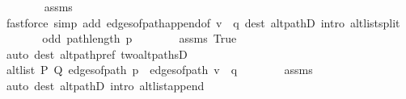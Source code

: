 \begin{isabellebody}
\ \ \ \ \ \ \isamarkupfalse%
\ assms{\isacharparenleft}{\kern0pt}{}{\isacharparenright}{\kern0pt}\isanewline
\ \ \ \ \ \ \isamarkupfalse%
\ {\isacharparenleft}{\kern0pt}fastforce\ simp\ add{\isacharcolon}{\kern0pt}\ edges{\isacharunderscore}{\kern0pt}of{\isacharunderscore}{\kern0pt}path{\isacharunderscore}{\kern0pt}append{\isacharunderscore}{\kern0pt}{}{\isacharbrackleft}{\kern0pt}of\ {\isachardoublequoteopen}v\ {\isacharhash}{\kern0pt}\ q{\isachardoublequoteclose}{\isacharbrackright}{\kern0pt}\ dest{\isacharcolon}{\kern0pt}\ alt{\isacharunderscore}{\kern0pt}pathD{\isacharparenleft}{\kern0pt}{}{\isacharparenright}{\kern0pt}\ intro{\isacharcolon}{\kern0pt}\ alt{\isacharunderscore}{\kern0pt}list{\isacharunderscore}{\kern0pt}split{\isacharunderscore}{\kern0pt}{}{\isacharparenright}{\kern0pt}\isanewline
\ \ \ \ \isamarkupfalse%
\ \isamarkupfalse%
\ {\isachardoublequoteopen}odd\ {\isacharparenleft}{\kern0pt}path{\isacharunderscore}{\kern0pt}length\ p{\isacharprime}{\kern0pt}{\isacharparenright}{\kern0pt}{\isachardoublequoteclose}\isanewline
\ \ \ \ \ \ \isamarkupfalse%
\ assms\ True\isanewline
\ \ \ \ \ \ \isamarkupfalse%
\ {\isacharparenleft}{\kern0pt}auto\ dest{\isacharcolon}{\kern0pt}\ alt{\isacharunderscore}{\kern0pt}path{\isacharunderscore}{\kern0pt}pref\ two{\isacharunderscore}{\kern0pt}alt{\isacharunderscore}{\kern0pt}pathsD{\isacharparenright}{\kern0pt}\isanewline
\ \ \ \ \isamarkupfalse%
\ \isamarkupfalse%
\ {\isachardoublequoteopen}alt{\isacharunderscore}{\kern0pt}list\ P\ Q\ {\isacharparenleft}{\kern0pt}edges{\isacharunderscore}{\kern0pt}of{\isacharunderscore}{\kern0pt}path\ p{\isacharprime}{\kern0pt}\ {\isacharat}{\kern0pt}\ edges{\isacharunderscore}{\kern0pt}of{\isacharunderscore}{\kern0pt}path\ {\isacharparenleft}{\kern0pt}v\ {\isacharhash}{\kern0pt}\ q{\isacharparenright}{\kern0pt}{\isacharparenright}{\kern0pt}{\isachardoublequoteclose}\isanewline
\ \ \ \ \ \ \isamarkupfalse%
\ assms{\isacharparenleft}{\kern0pt}{}{\isacharparenright}{\kern0pt}\isanewline
\ \ \ \ \ \ \isamarkupfalse%
\ {\isacharparenleft}{\kern0pt}auto\ dest{\isacharcolon}{\kern0pt}\ alt{\isacharunderscore}{\kern0pt}pathD{\isacharparenleft}{\kern0pt}{}{\isacharparenright}{\kern0pt}\ intro{\isacharcolon}{\kern0pt}\ alt{\isacharunderscore}{\kern0pt}list{\isacharunderscore}{\kern0pt}append{\isacharunderscore}{\kern0pt}{}{\isacharparenright}{\kern0pt}\isanewline

\end{isabellebody}
